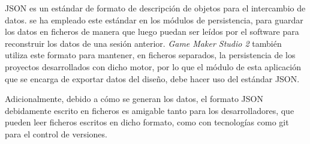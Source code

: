 JSON\cite{json} es un estándar\cite{jsonecma} de formato de descripción de objetos para el intercambio de datos.
se ha empleado este estándar en los módulos de persistencia, para guardar los datos en ficheros de manera que luego puedan ser leídos por el software para reconstruir los datos de una sesión anterior.
\textit{Game Maker Studio 2} también utiliza este formato para mantener, en ficheros separados, la persistencia de los proyectos desarrollados con dicho motor, por lo que el módulo de esta aplicación que se encarga de exportar datos del diseño, debe hacer uso del estándar JSON.

Adicionalmente, debido a cómo se generan los datos, el formato JSON debidamente escrito en ficheros es amigable tanto para los desarrolladores, que pueden leer ficheros escritos en dicho formato, como con tecnologías como git para el control de versiones.